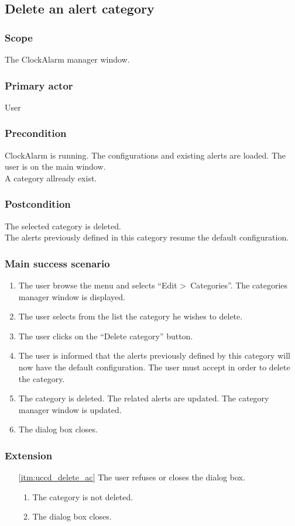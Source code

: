 \subsection{Delete an alert category}\label{subsec:usecase_delete_category}

\subsubsection{Scope}
The ClockAlarm manager window.
\subsubsection{Primary actor}
User
\subsubsection{Precondition}
ClockAlarm is running. The configurations and existing alerts are loaded. The user is on the main window.
\\A category allready exist.
\subsubsection{Postcondition}
The selected category is deleted.\\The alerts previously defined in this category resume the default configuration.
\subsubsection{Main success scenario}
\begin{enumerate}
	\item The user browse the menu and selects ``Edit \textgreater~Categories''. The categories manager window is displayed. 
	\item The user selects from the list the category he wishes to delete.
	\item The user clicks on the ``Delete category'' button.
	\item\label{itm:uccd_delete_ac} The user is informed that the alerts previously defined by this category will now have the default configuration. The user must accept in order to delete the category.
	\item The category is deleted. The related alerts are updated. The category manager window is updated. 
	\item The dialog box closes.
\end{enumerate}
\subsubsection{Extension}
\begin{enumerate}
	\item[\ref{itm:uccd_delete_ac}] The user refuses or closes the dialog box.
	\begin{enumerate}[i]
		\item The category is not deleted.
		\item The dialog box closes.
	\end{enumerate}
\end{enumerate}